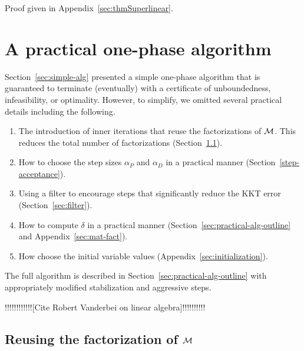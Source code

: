 \documentclass{article}
\begin{document}
Proof given in Appendix~\ref{sec:thmSuperlinear}.

\fi

\section{A practical one-phase algorithm}\label{sec:practical-alg}

Section~\ref{sec:simple-alg} presented a simple one-phase algorithm that is guaranteed to terminate (eventually) with a certificate of unboundedness, infeasibility, or optimality. However, to simplify, we omitted several practical details including the following.
\begin{enumerate}
\item The introduction of inner iterations that reuse the factorizations of $\mathcal{M}$. This reduces the total number of factorizations (Section~\ref{schur-reuse}).
\item How to choose the step sizes $\alpha_{P}$ and $\alpha_{D}$ in a practical manner (Section~\ref{step-acceptance}).
\item Using a filter to encourage steps that significantly reduce the KKT error (Section~\ref{sec:filter}).
\item How to compute $\delta$ in a practical manner (Section~\ref{sec:practical-alg-outline} and Appendix~\ref{sec:mat-fact}).
\item How choose the initial variable values (Appendix~\ref{sec:initialization}).
\end{enumerate}
The full algorithm is described in Section~\ref{sec:practical-alg-outline} with appropriately modified stabilization and aggressive steps. 

{\color{red} !!!!!!!!!!!![Cite Robert Vanderbei on linear algebra]!!!!!!!!!!}

\subsection{Reusing the factorization of $\mathcal{M}$}\label{schur-reuse}
\end{document}
